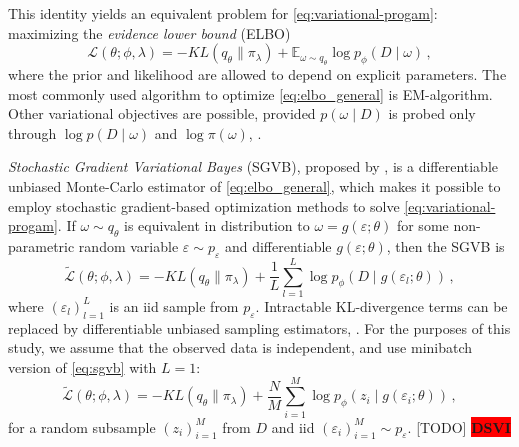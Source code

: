 \documentclass[a4paper,10pt]{article}
\newcommand{\important}[1]{\textbf{\!\colorbox{red}{#1}\!}}
\newcommand{\todo}[1]{{\color{blue} [TODO]} \important{#1}}
\begin{document}
This identity yields an equivalent problem for \eqref{eq:variational-progam}:
maximizing the \textit{evidence lower bound} (ELBO)
\begin{equation}  \label{eq:elbo_general}
  \mathcal{L}(\theta; \phi, \lambda)
    = - KL(q_{\theta} \| \pi_{\lambda})
      + \mathbb{E}_{\omega \sim q_{\theta}}
        \log p_{\phi}(D \mid \omega)
  \,,
\end{equation}
where the prior and likelihood are allowed to depend on explicit parameters. The most
commonly used algorithm to optimize \eqref{eq:elbo_general} is EM-algorithm. Other
variational objectives are possible, provided $p(\omega \mid D)$ is probed only through
$\log p(D \mid \omega)$ and $\log \pi(\omega)$, \citep{ranganath_operator_2018}.

\textit{Stochastic Gradient Variational Bayes} (SGVB), proposed by \citep{kingma_auto-encoding_2014},
is a differentiable unbiased Monte-Carlo estimator of \eqref{eq:elbo_general}, which
makes it possible to employ stochastic gradient-based optimization methods to solve
\eqref{eq:variational-progam}. If $
  \omega \sim q_{\theta}
$ is equivalent in distribution to $
  \omega = g(\varepsilon; \theta)
$ for some non-parametric random variable $
    \varepsilon \sim p_\varepsilon
$ and differentiable $
  g(\varepsilon; \theta)
$, then the SGVB is
\begin{equation}  \label{eq:sgvb}
  \widetilde{\mathcal{L}}(\theta; \phi, \lambda)
    = - KL(q_{\theta} \| \pi_{\lambda})
      + \frac1{L} \sum_{l=1}^L
        \log p_{\phi}(D \mid g(\varepsilon_{l}; \theta))
    \,, 
\end{equation}
where $
  (\varepsilon_{l})_{l=1}^L
$ is an iid sample from $p_\varepsilon$. Intractable KL-divergence terms can be replaced
by differentiable unbiased sampling estimators, \citep{kingma_auto-encoding_2014}.
%
For the purposes of this study, we assume that the observed data is independent, and
use minibatch version of \eqref{eq:sgvb} with $L=1$:
\begin{equation}  \label{eq:elbo}
  \widetilde{\mathcal{L}}(\theta; \phi, \lambda)
    = - KL(q_{\theta} \| \pi_{\lambda})
      + \frac{N}{M} \sum_{i=1}^M
        \log p_{\phi}(z_i \mid g(\varepsilon_i; \theta))
    \,,
\end{equation}
for a random subsample $(z_i)_{i=1}^M$ from $D$ and iid $
  (\varepsilon_i)_{i=1}^M \sim p_\varepsilon
$.
%
\todo{DSVI}
\citep{titsias_doubly_2014}
\end{document}
